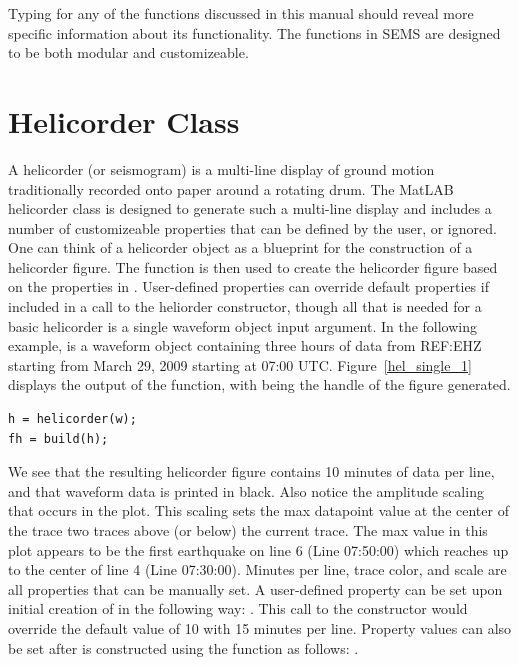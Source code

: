 \documentclass[11pt]{article}
\begin{document}
Typing  for any of the functions discussed in this manual should reveal more specific information about its functionality. The functions in SEMS are designed to be both modular and customizeable.
\clearpage


\section{Helicorder Class}

A helicorder (or seismogram) is a multi-line display of ground motion traditionally recorded onto paper around a rotating drum. The MatLAB helicorder class is designed to generate such a multi-line display and includes a number of customizeable properties that can be defined by the user, or ignored. One can think of a helicorder object  as a blueprint for the construction of a helicorder figure. The  function is then used to create the helicorder figure based on the properties in . User-defined properties can override default properties if included in a call to the heliorder constructor, though all that is needed for a basic helicorder is a single waveform object input argument. In the following example,  is a waveform object containing three hours of data from REF:EHZ starting from March 29, 2009 starting at 07:00 UTC. Figure~\ref{hel_single_1} displays the output of the  function, with  being the handle of the figure generated.   

\begin{lstlisting}
h = helicorder(w);
fh = build(h);
\end{lstlisting}

We see that the resulting helicorder figure contains 10 minutes of data per line, and that waveform data is printed in black. Also notice the amplitude scaling that occurs in the plot. This scaling sets the max datapoint value at the center of the trace two traces above (or below) the current trace. The max value in this plot appears to be the first earthquake on line 6 (Line 07:50:00) which reaches up to the center of line 4 (Line 07:30:00). Minutes per line, trace color, and scale are all properties that can be manually set. A user-defined property can be set upon initial creation of  in the following way: . This call to the constructor would override the default value of 10 with 15 minutes per line. Property values can also be set after  is constructed using the  function as follows: .
\end{document}
